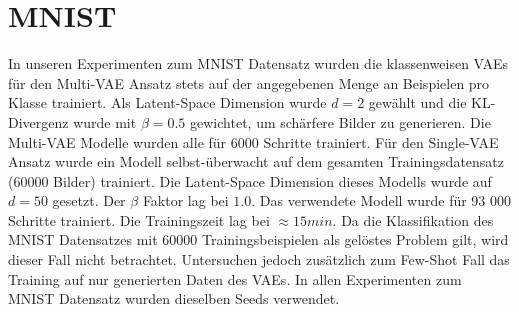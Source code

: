 \section{MNIST}
In unseren Experimenten zum MNIST Datensatz wurden die klassenweisen VAEs für den Multi-VAE Ansatz stets auf der angegebenen Menge an Beispielen pro Klasse trainiert. Als Latent-Space Dimension wurde $d = 2$ gewählt und die KL-Divergenz wurde mit $\beta = 0.5$ gewichtet, um schärfere Bilder zu generieren. Die Multi-VAE Modelle wurden alle für 6000 Schritte trainiert. Für den Single-VAE Ansatz wurde ein Modell selbst-überwacht auf dem gesamten Trainingsdatensatz (60000 Bilder) trainiert. Die Latent-Space Dimension dieses Modells wurde auf $d = 50$ gesetzt. Der $\beta$ Faktor lag bei $1.0$. Das verwendete Modell wurde für 93 000 Schritte trainiert. Die Trainingszeit lag bei $\approx 15 min$. Da die Klassifikation des MNIST Datensatzes mit 60000 Trainingsbeispielen als gelöstes Problem gilt, wird dieser Fall nicht betrachtet. Untersuchen jedoch zusätzlich zum Few-Shot Fall das Training auf nur generierten Daten des VAEs. In allen Experimenten zum MNIST Datensatz wurden dieselben Seeds verwendet.

